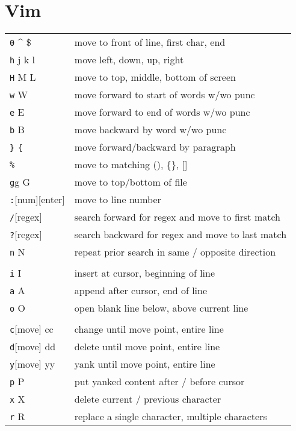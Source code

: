\documentclass[10pt,twoside,openright]{memoir}
\begin{document}
\pagestyle{empty}


\chapter{Vim}

{\footnotesize
\begin{tabular}{ll}
{\texttt 0 \^{} \$} & move to front of line, first char, end \\
{\texttt h j k l} & move left, down, up, right \\
{\texttt H M L} & move to top, middle, bottom of screen \\
{\texttt w W} & move forward to start of words w/wo punc \\
{\texttt e E} & move forward to end of words w/wo punc \\
{\texttt b B} & move backward by word w/wo punc \\
{\texttt \} \verb|{| } & move forward/backward by paragraph \\
{\texttt \%} & move to matching (), \{\}, [] \\
{\texttt gg G} & move to top/bottom of file \\
{\texttt :[num][enter]} & move to line number \\
{\texttt /[regex]} & search forward for regex and move to first match \\
{\texttt ?[regex]} & search backward for regex and move to last match \\
{\texttt n N} & repeat prior search in same / opposite direction \\
& \\
{\texttt i I} & insert at cursor, beginning of line \\
{\texttt a A} & append after cursor, end of line \\
{\texttt o O} & open blank line below, above current line \\
& \\
{\texttt c[move] cc} & change until move point, entire line \\
{\texttt d[move] dd} & delete until move point, entire line \\
{\texttt y[move] yy} & yank until move point, entire line \\
{\texttt p P} & put yanked content after / before cursor \\
{\texttt x X} & delete current / previous character \\
{\texttt r R} & replace a single character, multiple characters\\

\end{tabular}}
\end{document}
